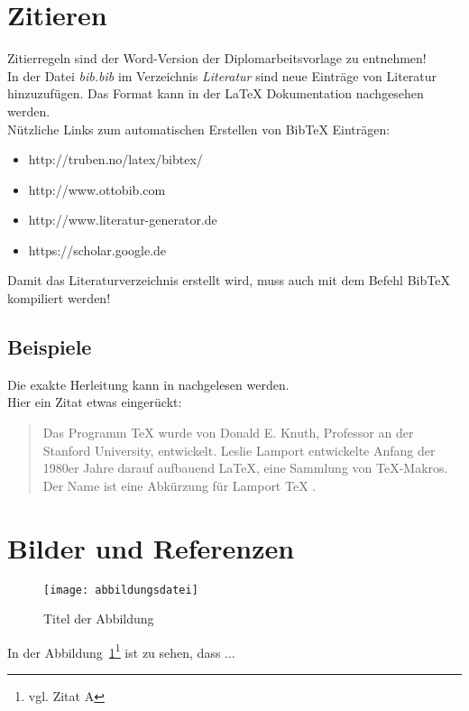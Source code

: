 \section{Zitieren}
Zitierregeln sind der Word-Version der Diplomarbeitsvorlage zu entnehmen! \\
In der Datei \textit{bib.bib} im Verzeichnis \textit{Literatur} sind neue Eintr\"age von Literatur hinzuzuf\"ugen. Das Format kann in der \LaTeX{} Dokumentation nachgesehen werden. \\
N\"utzliche Links zum automatischen Erstellen von BibTeX Eintr\"agen:
\begin{itemize}
	\item http://truben.no/latex/bibtex/
	\item http://www.ottobib.com
	\item http://www.literatur-generator.de
	\item https://scholar.google.de
\end{itemize}
Damit das Literaturverzeichnis erstellt wird, muss auch mit dem Befehl BibTeX kompiliert werden! \\
\subsection{Beispiele}
Die exakte Herleitung kann in \cite{Prager1961} nachgelesen werden. \\
Hier ein Zitat etwas einger\"uckt:
\begin{quote}
Das Programm TeX wurde von Donald E. Knuth, Professor an der Stanford University, entwickelt. Leslie Lamport entwickelte Anfang der 1980er Jahre darauf aufbauend LaTeX, eine Sammlung von TeX-Makros. Der Name ist eine Abk\"urzung für Lamport TeX \cite{latextug}.
\end{quote}

\section{Bilder und Referenzen}
\begin{figure}[htbp]
\centering
\texttt{[image: abbildungsdatei]} %
\caption{Titel der Abbildung} 
\label{fig:bild1}
\end{figure}

In der Abbildung~\ref{fig:bild1}\footnote{vgl. Zitat A\cite{referenzA}} %
ist zu sehen, dass ...

